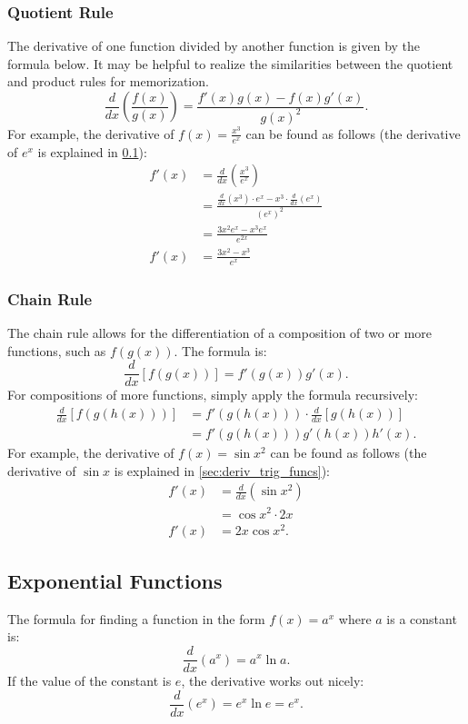 \documentclass[12pt]{article}
\begin{document}
\subsubsection{Quotient Rule}
The derivative of one function divided by another function is given by the formula below. It may be helpful to realize the similarities between the quotient and product rules for memorization.
\[ \frac{d}{dx} \left( \frac{f(x)}{g(x)} \right) = \frac{f'(x) g(x) - f(x) g'(x)}{g(x)^2}. \]
For example, the derivative of $f(x) = \frac{x^3}{e^x}$ can be found as follows (the derivative of $e^x$ is explained in \ref{sec:deriv_exp_funcs}):
\begin{align*}
	f'(x) &= \frac{d}{dx} \left( \frac{x^3}{e^x} \right) \\[5pt]
	&= \frac{\frac{d}{dx} \left( x^3 \right) \cdot e^x - x^3 \cdot \frac{d}{dx} \left( e^x \right)}{\left( e^x \right)^2} \\[5pt]
	&= \frac{3x^2 e^x - x^3 e^x}{e^{2x}} \\[5pt]
	f'(x) &= \frac{3x^2 - x^3}{e^x}
\end{align*}

\subsubsection{Chain Rule}
The chain rule allows for the differentiation of a composition of two or more functions, such as $f(g(x))$. The formula is:
\[ \frac{d}{dx} \left[ f(g(x)) \right] = f'(g(x)) g'(x). \]
For compositions of more functions, simply apply the formula recursively:
\begin{align*}
	\frac{d}{dx} \left[ f(g(h(x))) \right] &= f'(g(h(x))) \cdot \frac{d}{dx} \left[ g(h(x)) \right] \\
	&= f'(g(h(x))) g'(h(x)) h'(x).
\end{align*}
For example, the derivative of $f(x) = \sin x^2$ can be found as follows (the derivative of $\sin x$ is explained in \ref{sec:deriv_trig_funcs}):
\begin{align*}
	f'(x) &= \frac{d}{dx} \left( \sin x^2 \right) \\[5pt]
	&= \cos x^2 \cdot 2x \\
	f'(x) &= 2x \cos x^2.
\end{align*}

\subsection{Exponential Functions}
\label{sec:deriv_exp_funcs}
The formula for finding a function in the form $f(x) = a^x$ where $a$ is a constant is:
\[ \frac{d}{dx} (a^x) = a^x \ln a. \]
If the value of the constant is $e$, the derivative works out nicely:
\[ \frac{d}{dx} (e^x) = e^x \ln e = e^x. \]
\end{document}
